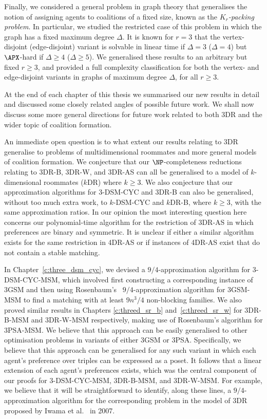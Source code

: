 Finally, we considered a general problem in graph theory that generalises the notion of assigning agents to coalitions of a fixed size, known as the \emph{$K_r$-packing problem}. In particular, we studied the restricted case of this problem in which the graph has a fixed maximum degree $\Delta$. It is known for $r=3$ that the vertex-disjoint (edge-disjoint) variant is solvable in linear time if $\Delta=3$ ($\Delta=4$) but $\APX$-hard if $\Delta \geq 4$ ($\Delta \geq 5$). We generalised these results to an arbitrary but fixed $r \geq 3$, and provided a full complexity classification for both the vertex- and edge-disjoint variants in graphs of maximum degree $\Delta$, for all $r \geq 3$.

At the end of each chapter of this thesis we summarised our new results in detail and discussed some closely related angles of possible future work. We shall now discuss some more general directions for future work related to both 3DR and the wider topic of coalition formation. 

An immediate open question is to what extent our results relating to 3DR generalise to problems of multidimensional roommates and more general models of coalition formation. We conjecture that our $\NP$-completeness reductions relating to 3DR-B, 3DR-W, and 3DR-AS can all be generalised to a model of $k$-dimensional roommates ($k$DR) where $k \geq 3$. We also conjecture that our approximation algorithms for 3-DSM-CYC and 3DR-B can also be generalised, without too much extra work, to $k$-DSM-CYC and $k$DR-B, where $k \geq 3$, with the same approximation ratios. In our opinion the most interesting question here concerns our polynomial-time algorithm for the restriction of 3DR-AS in which preferences are binary and symmetric. It is unclear if either a similar algorithm exists for the same restriction in 4DR-AS or if instances of 4DR-AS exist that do not contain a stable matching.

In Chapter~\ref{c:three_dsm_cyc}, we devised a $9/4$-approximation algorithm for 3-DSM-CYC-MSM, which involved first constructing a corresponding instance of 3GSM and then using Rosenbaum's~\cite{rosenbaum16} $9/4$-approximation algorithm for 3GSM-MSM to find a matching with at least $9n^3/4$ non-blocking families. We also proved similar results in Chapters \ref{c:threed_sr_b} and~\ref{c:threed_sr_w} for 3DR-B-MSM and 3DR-W-MSM respectively, making use of Rosenbaum's algorithm for 3PSA-MSM. We believe that this approach can be easily generalised to other optimisation problems in variants of either 3GSM or 3PSA. Specifically, we believe that this approach can be generalised for any such variant in which each agent's preference over triples can be expressed as a poset. It follows that a linear extension of each agent's preferences exists, which was the central component of our proofs for 3-DSM-CYC-MSM, 3DR-B-MSM, and 3DR-W-MSM. For example, we believe that it will be straightforward to identify, along these lines, a $9/4$-approximation algorithm for the corresponding problem in the model of 3DR proposed by Iwama et al.~\cite{IMO07} in 2007.

